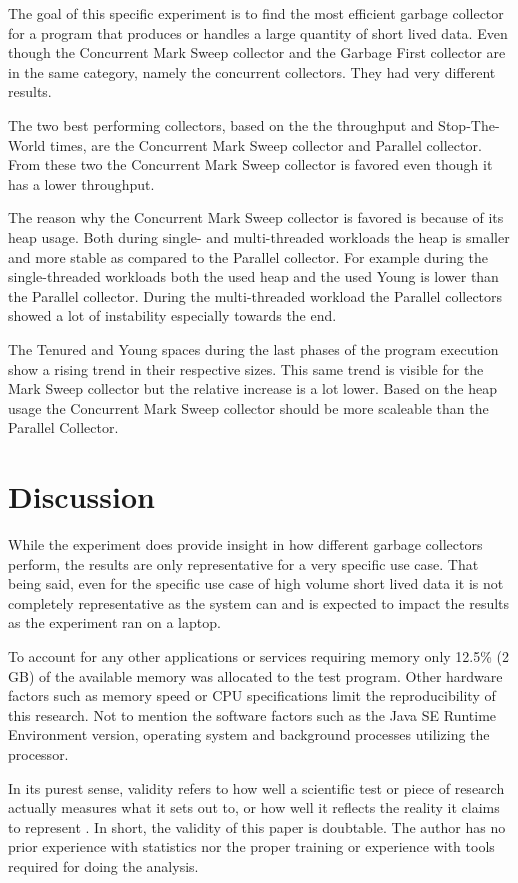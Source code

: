 \documentclass[11pt,a4paper]{article}
\begin{document}
The goal of this specific experiment is to find the most efficient garbage collector for a program that produces or handles a large quantity of short lived data. Even though the Concurrent Mark Sweep collector and the Garbage First collector are in the same category, namely the concurrent collectors. They had very different results.

The two best performing collectors, based on the the throughput and Stop-The-World times, are the Concurrent Mark Sweep collector and Parallel collector. From these two the Concurrent Mark Sweep collector is favored even though it has a lower throughput.

The reason why the Concurrent Mark Sweep collector is favored is because of its heap usage. Both during single- and multi-threaded workloads the heap is smaller and more stable as compared to the Parallel collector. For example during the single-threaded workloads both the used heap and the used Young is lower than the Parallel collector. During the multi-threaded workload the Parallel collectors showed a lot of instability especially towards the end.

The Tenured and Young spaces during the last phases of the program execution show a rising trend in their respective sizes. This same trend is visible for the Mark Sweep collector but the relative increase is a lot lower. Based on the heap usage the Concurrent Mark Sweep collector should be more scaleable than the Parallel Collector.

\newpage
\section{Discussion}
While the experiment does provide insight in how different garbage collectors perform, the results are only representative for a very specific use case. That being said, even for the specific use case of high volume short lived data it is not completely representative as the system can and is expected to impact the results as the experiment ran on a laptop.

To account for any other applications or services requiring memory only 12.5\% (2 GB) of the available memory was allocated to the test program. Other hardware factors such as memory speed or CPU specifications limit the reproducibility of this research. Not to mention the software factors such as the Java SE Runtime Environment version, operating system and background processes utilizing the processor.

In its purest sense, validity refers to how well a scientific test or piece of research actually measures what it sets out to, or how well it reflects the reality it claims to represent \cite{AQR_RELIABILITY}. In short, the validity of this paper is doubtable. The author has no prior experience with statistics nor the proper training or experience with tools required for doing the analysis.
\end{document}
